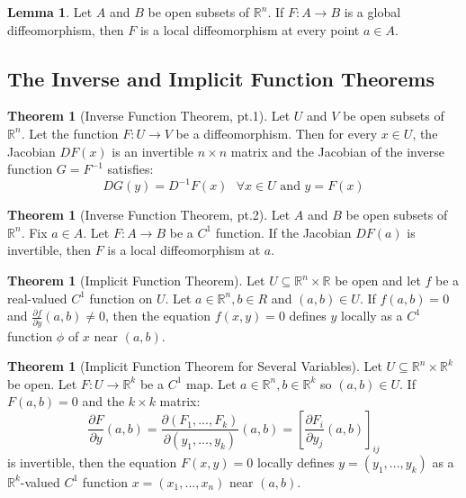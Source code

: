 \documentclass[12pt]{article}
\theoremstyle{definition}
\newtheorem{lemma}[definition]{Lemma}
\newtheorem{theorem}[definition]{Theorem}
\theoremstyle{remark}
\begin{document}
\begin{lemma}
Let $A$ and $B$ be open subsets of $\mathbb{R}^n.$ If $F:A\rightarrow B$ is a global diffeomorphism, then $F$ is a local diffeomorphism at every point $a\in A.$
\end{lemma}

\subsection{The Inverse and Implicit Function Theorems}
\begin{theorem}[Inverse Function Theorem, pt.1]
Let $U$ and $V$ be open subsets of $\mathbb{R}^n.$ Let the function $F:U\rightarrow V$ be a diffeomorphism. Then for every $x\in U$, the Jacobian $DF(x)$ is an invertible $n\times n$ matrix and the Jacobian of the inverse function $G=F^{-1}$ satisfies:
\[
DG(y)=D^{-1}F(x) \text{ }\forall x\in U \text{ and }y=F(x)
\]
\end{theorem}

\begin{theorem}[Inverse Function Theorem, pt.2]
Let $A$ and $B$ be open subsets of $\mathbb{R}^n.$ Fix $a\in A$. Let $F:A\rightarrow B$ be a $C^1$ function. If the Jacobian $DF(a)$ is  invertible, then $F$ is a local diffeomorphism at $a.$
\end{theorem}

\begin{theorem}[Implicit Function Theorem]
Let $U\subseteq \mathbb{R}^n\times\mathbb{R}$ be open and let $f$ be a real-valued $C^1$ function on $U$. Let $a\in\mathbb{R}^n, b\in{R}$ and $(a,b)\in U.$ If $f(a,b)=0$ and $\displaystyle\frac{\partial f}{\partial y}(a,b)\neq 0$, then the equation $f(x,y)=0$ defines $y$ locally as a $C^1$ function $\phi$ of $x$ near $(a,b).$
\end{theorem}

\begin{theorem}[Implicit Function Theorem for Several Variables]
Let $U\subseteq \mathbb{R}^n\times\mathbb{R}^k$ be open. Let $F:U\rightarrow \mathbb{R}^k$ be a $C^1$ map. Let $a\in\mathbb{R}^n, b\in\mathbb{R}^k$ so $(a,b)\in U.$ If $F(a,b)=0$ and the $k\times k$ matrix:
\[
\frac{\partial F}{\partial y}(a,b)=\frac{\partial (F_1,...,F_k)}{\partial (y_1,...,y_k)}(a,b)=\left[\frac{\partial F_i}{\partial y_j}(a,b)\right]_{ij}
\]
is invertible, then the equation $F(x,y)=0$ locally defines $y=(y_1,...,y_k)$ as a $\mathbb{R}^k$-valued $C^1$ function $x=(x_1,...,x_n)$ near $(a,b).$
\end{theorem}
\end{document}
